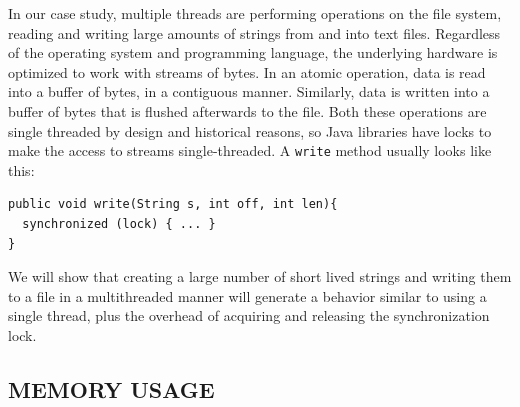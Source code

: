 \documentclass[a4paper,twoside]{article}
\begin{document}
In our case study, multiple threads are performing operations on the file system, reading and writing large amounts of strings from and into text files.
Regardless of the operating system and programming language, the underlying hardware is optimized to work with streams of bytes. In an atomic operation, data is read into a buffer of bytes, in a contiguous manner. Similarly, data is written into a buffer of bytes that is flushed afterwards to the file. Both these operations are single threaded by design and historical reasons, so Java libraries have locks to make the access to streams single-threaded. A \texttt{write} method usually looks like this:
\begin{small}
\begin{verbatim}
public void write(String s, int off, int len){
  synchronized (lock) { ... }
}
\end{verbatim}
\end{small}

%

We will show that creating a large number of short lived strings and writing them to a file in a multithreaded manner will generate a behavior similar to using a single thread, plus the overhead of acquiring and releasing the synchronization lock.


%



\subsection{\uppercase{Memory Usage}}
\end{document}
